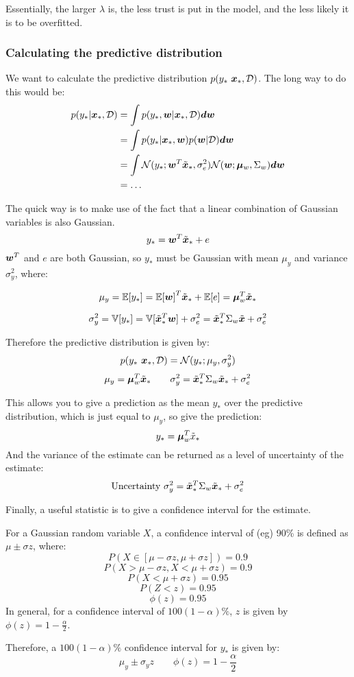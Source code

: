 \documentclass[../../main.tex]{subfiles}
\begin{document}
Essentially, the larger $\lambda$ is, the less trust is put in the model, and the less likely it is to be overfitted.


\subsubsection{Calculating the predictive distribution}

We want to calculate the predictive distribution $p(y_* \ \bm{x}_*, \mathcal{D})$.
The long way to do this would be:
\begin{align*}
    p(y_* | \bm{x}_*, \mathcal{D})
    &= \int p(y_*, \bm{w} | \bm{x}_*, \mathcal{D}) \bm{dw} \\
    &= \int p(y_* | \bm{x}_*, \bm{w})p(\bm{w} | \mathcal{D}) \bm{dw} \\
    &= \int \mathcal{N}(y_*; \bm{w}^T\tilde{\bm{x}}_*, \sigma_e^2)\mathcal{N}(\bm{w};\bm{\mu}_w, \Sigma_w) \bm{dw} \\
    &= \ldots
\end{align*}

The quick way is to make use of the fact that a linear combination of Gaussian variables is also Gaussian.
\[ y_* = \bm{w}^T\tilde{\bm{x}}_* + e \]
$\bm{w}^T$ and $e$ are both Gaussian, so $y_*$ must be Gaussian with mean $\mu_y$ and variance $\sigma_y^2$, where:

\[
\mu_y = \mathbb{E}[y_*] = {\mathbb{E}[\bm{w}]}^T\tilde{\bm{x}}_* + \mathbb{E}[e] = \bm{\mu}_w^T\tilde{\bm{x}}_*
\]

\[
    \sigma_y^2 = \mathbb{V}[y_*] = \mathbb{V}[\tilde{\bm{x}}_*^T\bm{w}] + \sigma_e^2 = \tilde{\bm{x}}_*^T\Sigma_w\tilde{\bm{x}} + \sigma_e^2
\]

Therefore the predictive distribution is given by:
\[ p(y_* \ \bm{x}_*, \mathcal{D}) =
\mathcal{N}(y_* ; \mu_y, \sigma_y^2)\]
\[
\mu_y = \bm{\mu}_w^T\tilde{\bm{x}}_* \quad\quad
\sigma_y^2 = \tilde{\bm{x}}_*^T \Sigma_w \tilde{\bm{x}}_* + \sigma_e^2
\]

This allows you to give a prediction as the mean $y_*$ over the predictive distribution, which is just equal to $\mu_y$, so give the prediction:
\[ y_* = \bm{\mu}_w^T\tilde{x}_* \]
And the variance of the estimate can be returned as a level of uncertainty of the estimate:
\[ \textrm{Uncertainty } \sigma_y^2 = \tilde{\bm{x}}_*^T \Sigma_w \tilde{\bm{x}}_* + \sigma_e^2
\]

Finally, a useful statistic is to give a confidence interval for the estimate.

For a Gaussian random variable $X$, a confidence interval of (eg) 90\% is defined as $\mu \pm \sigma z$, where:
\[ P(X \in [\mu - \sigma z, \mu + \sigma z]) = 0.9 \]
\[ P(X > \mu - \sigma z , X < \mu + \sigma z) = 0.9 \]
\[ P(X < \mu + \sigma z) = 0.95 \]
\[ P(Z < z) = 0.95 \]
\[ \phi(z) = 0.95 \]
In general, for a confidence interval of $100(1 - \alpha)\%$, $z$ is given by $\phi(z) = 1 - \frac{\alpha}{2}$.

Therefore, a $100(1 - \alpha)\%$ confidence interval for $y_*$ is given by:
\[ \mu_y \pm \sigma_y z \quad\quad \phi(z) = 1 - \frac{\alpha}{2}\]
\end{document}
